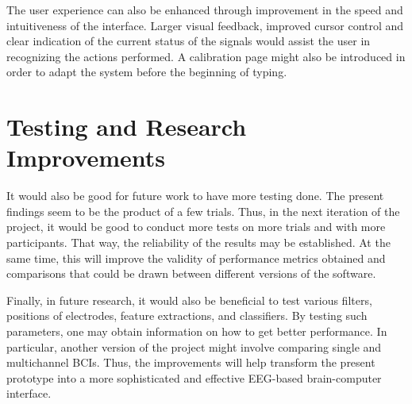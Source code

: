 The user experience can also be enhanced through improvement in the speed and intuitiveness of the interface. Larger visual feedback, improved cursor control and clear indication of the current status of the signals would assist the user in recognizing the actions performed. A calibration page might also be introduced in order to adapt the system before the beginning of typing.

\section{Testing and Research Improvements}

It would also be good for future work to have more testing done. The present findings seem to be the product of a few trials. Thus, in the next iteration of the project, it would be good to conduct more tests on more trials and with more participants. That way, the reliability of the results may be established. At the same time, this will improve the validity of performance metrics obtained and comparisons that could be drawn between different versions of the software.

Finally, in future research, it would also be beneficial to test various filters, positions of electrodes, feature extractions, and classifiers. By testing such parameters, one may obtain information on how to get better performance. In particular, another version of the project might involve comparing single and multichannel BCIs. Thus, the improvements will help transform the present prototype into a more sophisticated and effective EEG-based brain-computer interface.
